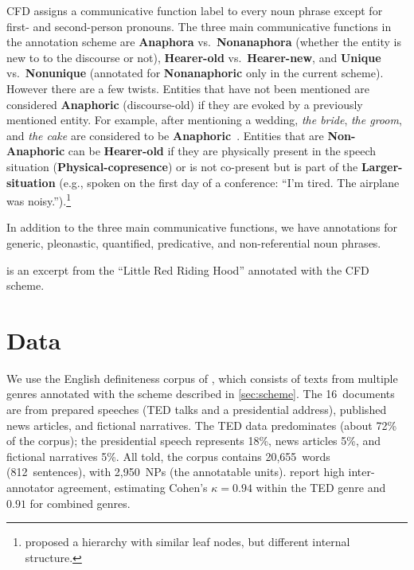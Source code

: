 \documentclass[11pt,letterpaper]{article}
\newcommand{\ensuretext}[1]{#1}
\newcommand{\nssmarker}{\ensuretext{\textcolor{magenta}{\ensuremath{^{\textsc{NS}}_{\textsc{S}}}}}}
\newcommand{\arkcomment}[3]{\ensuretext{\textcolor{#3}{[#1 #2]}}}
\newcommand{\nss}[1]{\arkcomment{\nssmarker}{#1}{magenta}}
\newcommand{\finalversion}[1]{}
\begin{document}
CFD assigns a communicative function label to every noun phrase except for first- and second-person pronouns.
The three main communicative functions in the annotation scheme are {\bf Anaphora} vs.~{\bf Nonanaphora} 
(whether the entity is new to to the discourse or not), {\bf Hearer-old} vs.~{\bf Hearer-new}, 
and {\bf Unique} vs.~{\bf Nonunique} (annotated for {\bf Nonanaphoric} only in the current scheme).  
However there are a few twists.   
Entities that have not been mentioned are considered {\bf Anaphoric} (discourse-old) 
if they are evoked by a previously mentioned entity.   
For example, after mentioning a wedding, {\em the bride}, {\em the groom}, and {\em the cake} 
are considered to be {\bf Anaphoric}~\citep{clark77,poesio98}.  
Entities that are {\bf Non-Anaphoric} can be {\bf Hearer-old} if they are physically present 
in the speech situation ({\bf Physical-copresence}) or is not co-present but is part of the {\bf Larger-situation} 
(e.g., spoken on the first day of a conference: ``I'm tired. The airplane was noisy.'').\footnote{\citet{komen-13} proposed a hierarchy with similar leaf nodes, but different internal structure.}  

In addition to the three main communicative functions, we have annotations for 
generic, pleonastic, quantified, predicative, and non-referential noun phrases.   

 is an excerpt from the ``Little Red Riding Hood'' annotated with the CFD scheme.





\section{Data}\label{sec:data}

We use the English definiteness corpus of \citet{bhatia14}, 
which consists of texts from multiple genres annotated with the scheme described in \cref{sec:scheme}. 
The 16~documents are from prepared speeches (TED talks and a presidential address), 
published news articles, and fictional narratives. 
The TED data predominates (about 72\% of the corpus);\finalversion{\footnote{\nss{note that The TED talks are from a large parallel corpus?}}} 
the presidential speech represents 18\%, news articles 5\%, and fictional narratives 5\%. 
All told, the corpus contains 20,655~words (812~sentences), with 2,950~NPs (the annotatable units). 
\citet{bhatia14} report high inter-annotator agreement, estimating Cohen's $\kappa = 0.94$ within the TED genre 
and $0.91$ for combined genres\finalversion{\nss{update---this was on a previous version of the annotation scheme.}}.  
\end{document}
